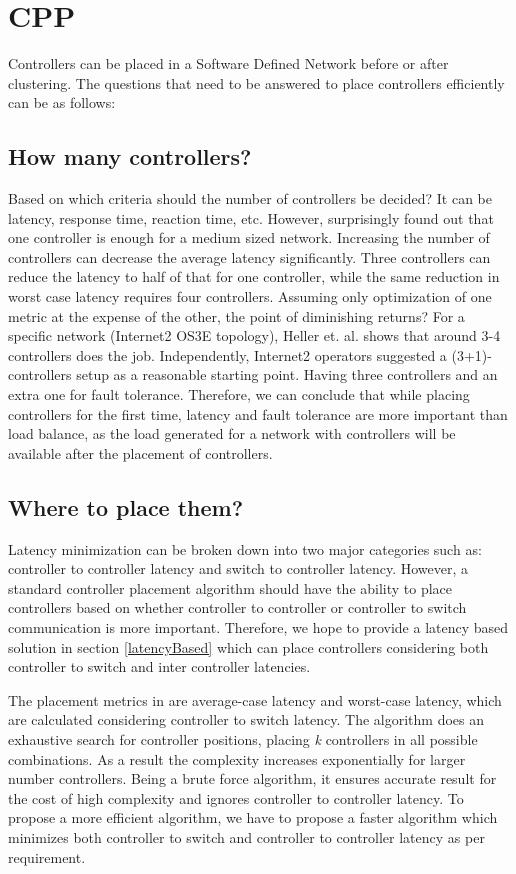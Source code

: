 \documentclass{article}
\begin{document}
	\section{CPP}
	Controllers can be placed in a Software Defined Network before or after clustering. The questions that need to be answered to place controllers efficiently can be as follows:
	\subsection{How many controllers?}
	Based on which criteria should the number of controllers be decided? It can be latency, response time, reaction time, etc. However, \cite{cpp2012heller} surprisingly found out that one controller is enough for a medium sized network. Increasing the number of controllers can decrease the average latency significantly. Three controllers can reduce the latency to half of that for one controller, while the same reduction in worst case latency requires four controllers. Assuming only optimization of one metric at the expense of the other, the point of diminishing returns? For a specific network (Internet2 OS3E topology), Heller et. al. shows that around 3-4 controllers does the job. Independently, Internet2 operators suggested a (3+1)-controllers setup as a reasonable starting point. Having three controllers and an extra one for fault tolerance. Therefore, we can conclude that while placing controllers for the first time, latency and fault tolerance are more important than load balance, as the load generated for a network with controllers will be available after the placement of controllers.
	
	\subsection{Where to place them?}
	Latency minimization can be broken down into two major categories such as: controller to controller latency and switch to controller latency. However, a standard controller placement algorithm should have the ability to place controllers based on whether controller to controller or controller to switch communication is more important. Therefore, we hope to provide a latency based solution in section \ref{latencyBased} which can place controllers considering both controller to switch and inter controller latencies.
	
	The placement metrics in \cite{cpp2012heller} are average-case latency and worst-case latency, which are calculated considering controller to switch latency. The algorithm does an exhaustive search for controller positions, placing \textit{k} controllers in all possible combinations. As a result the complexity increases exponentially for larger number controllers. Being a brute force algorithm, it ensures accurate result for the cost of high complexity and ignores controller to controller latency. To propose a more efficient algorithm, we have to propose a faster algorithm which minimizes both controller to switch and controller to controller latency as per requirement.
	
\end{document}
